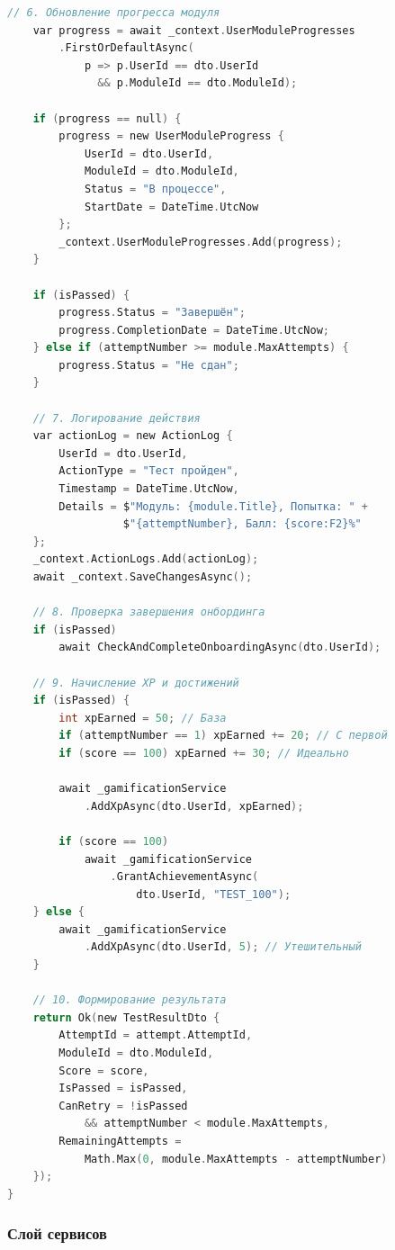 \begin{lstlisting}[language=C, basicstyle=\ttfamily\small]
    // 6. Обновление прогресса модуля
    var progress = await _context.UserModuleProgresses
        .FirstOrDefaultAsync(
            p => p.UserId == dto.UserId 
              && p.ModuleId == dto.ModuleId);
    
    if (progress == null) {
        progress = new UserModuleProgress {
            UserId = dto.UserId,
            ModuleId = dto.ModuleId,
            Status = "В процессе",
            StartDate = DateTime.UtcNow
        };
        _context.UserModuleProgresses.Add(progress);
    }
    
    if (isPassed) {
        progress.Status = "Завершён";
        progress.CompletionDate = DateTime.UtcNow;
    } else if (attemptNumber >= module.MaxAttempts) {
        progress.Status = "Не сдан";
    }
    
    // 7. Логирование действия
    var actionLog = new ActionLog {
        UserId = dto.UserId,
        ActionType = "Тест пройден",
        Timestamp = DateTime.UtcNow,
        Details = $"Модуль: {module.Title}, Попытка: " +
                  $"{attemptNumber}, Балл: {score:F2}%"
    };
    _context.ActionLogs.Add(actionLog);
    await _context.SaveChangesAsync();
    
    // 8. Проверка завершения онбординга
    if (isPassed)
        await CheckAndCompleteOnboardingAsync(dto.UserId);
    
    // 9. Начисление XP и достижений
    if (isPassed) {
        int xpEarned = 50; // База
        if (attemptNumber == 1) xpEarned += 20; // С первой
        if (score == 100) xpEarned += 30; // Идеально
        
        await _gamificationService
            .AddXpAsync(dto.UserId, xpEarned);
        
        if (score == 100)
            await _gamificationService
                .GrantAchievementAsync(
                    dto.UserId, "TEST_100");
    } else {
        await _gamificationService
            .AddXpAsync(dto.UserId, 5); // Утешительный
    }
    
    // 10. Формирование результата
    return Ok(new TestResultDto {
        AttemptId = attempt.AttemptId,
        ModuleId = dto.ModuleId,
        Score = score,
        IsPassed = isPassed,
        CanRetry = !isPassed 
            && attemptNumber < module.MaxAttempts,
        RemainingAttempts = 
            Math.Max(0, module.MaxAttempts - attemptNumber)
    });
}
\end{lstlisting}

\subsubsection{Слой сервисов}


